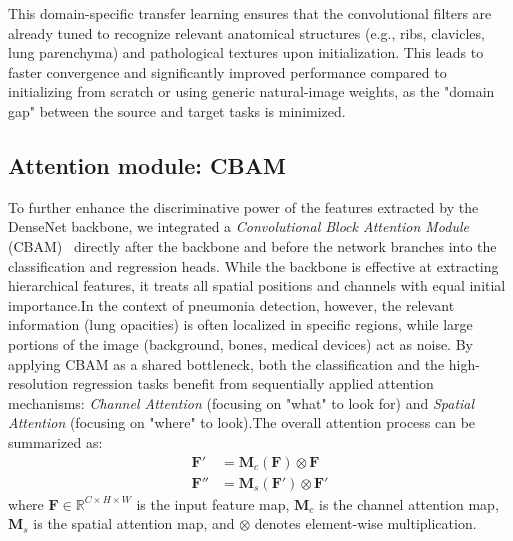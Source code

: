 \documentclass[a4paper,fleqn]{cas-dc}
\begin{document}
This domain-specific transfer learning ensures that the convolutional filters are already tuned to recognize relevant anatomical structures (e.g., ribs, clavicles, lung parenchyma) and pathological textures upon initialization. This leads to faster convergence and significantly improved performance compared to initializing from scratch or using generic natural-image weights, as the "domain gap" between the source and target tasks is minimized.

\subsection{Attention module: CBAM}To further enhance the discriminative power of the features extracted by the DenseNet backbone, we integrated a \textit{Convolutional Block Attention Module} (CBAM)~\cite{cbam} directly after the backbone and before the network branches into the classification and regression heads. While the backbone is effective at extracting hierarchical features, it treats all spatial positions and channels with equal initial importance.In the context of pneumonia detection, however, the relevant information (lung opacities) is often localized in specific regions, while large portions of the image (background, bones, medical devices) act as noise. By applying CBAM as a shared bottleneck, both the classification and the high-resolution regression tasks benefit from sequentially applied attention mechanisms: \textit{Channel Attention} (focusing on "what" to look for) and \textit{Spatial Attention} (focusing on "where" to look).The overall attention process can be summarized as:$$\begin{aligned} \mathbf{F}' &= \mathbf{M}_c(\mathbf{F}) \otimes \mathbf{F} \\ \mathbf{F}'' &= \mathbf{M}_s(\mathbf{F}') \otimes \mathbf{F}' \end{aligned}$$where $\mathbf{F} \in \mathbb{R}^{C \times H \times W}$ is the input feature map, $\mathbf{M}_c$ is the channel attention map, $\mathbf{M}_s$ is the spatial attention map, and $\otimes$ denotes element-wise multiplication.
\end{document}
